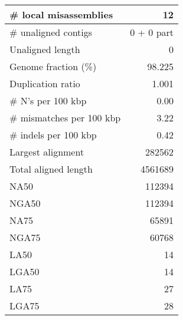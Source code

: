 \documentclass[12pt,a4paper]{article}
\begin{document}
\begin{table}[ht]
\begin{center}
\begin{tabular}{|l*{1}{|r}|}
\# local misassemblies & 12 \\ \hline
\# unaligned contigs & 0 + 0 part \\ \hline
Unaligned length & 0 \\ \hline
Genome fraction (\%) & 98.225 \\ \hline
Duplication ratio & 1.001 \\ \hline
\# N's per 100 kbp & 0.00 \\ \hline
\# mismatches per 100 kbp & 3.22 \\ \hline
\# indels per 100 kbp & 0.42 \\ \hline
Largest alignment & 282562 \\ \hline
Total aligned length & 4561689 \\ \hline
NA50 & 112394 \\ \hline
NGA50 & 112394 \\ \hline
NA75 & 65891 \\ \hline
NGA75 & 60768 \\ \hline
LA50 & 14 \\ \hline
LGA50 & 14 \\ \hline
LA75 & 27 \\ \hline
LGA75 & 28 \\ \hline
\end{tabular}
\end{center}
\end{table}
\end{document}
